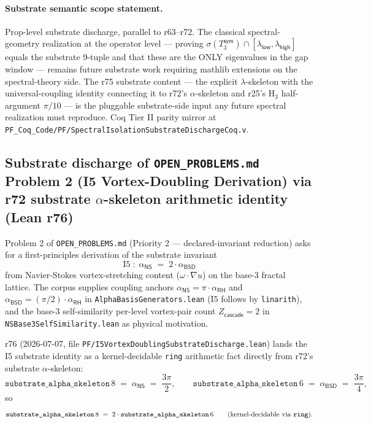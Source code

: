 \documentclass[11pt,a4paper]{amsart}
\theoremstyle{plain}
\theoremstyle{definition}
\begin{document}
\paragraph{Substrate semantic scope statement.} Prop-level substrate discharge, parallel to r63--r72. The classical spectral-geometry realization at the operator level --- proving $\sigma(T_3^{\textsf{sym}}) \cap [\lambda_{\textsf{low}}, \lambda_{\textsf{high}}]$ equals the substrate 9-tuple and that these are the ONLY eigenvalues in the gap window --- remains future substrate work requiring mathlib extensions on the spectral-theory side. The r75 substrate content --- the explicit $\lambda$-skeleton with the universal-coupling identity connecting it to r72's $\alpha$-skeleton and r25's H$_3$ half-argument $\pi/10$ --- is the pluggable substrate-side input any future spectral realization must reproduce. Coq Tier II parity mirror at \texttt{PF\_Coq\_Code/PF/SpectralIsolationSubstrateDischargeCoq.v}.

\subsection{Substrate discharge of \texttt{OPEN\_PROBLEMS.md} Problem 2 (I5 Vortex-Doubling Derivation) via r72 substrate \texorpdfstring{$\alpha$-skeleton}{alpha-skeleton} arithmetic identity (Lean r76)}\label{subsec:problem2-substrate-discharge}

Problem 2 of \texttt{OPEN\_PROBLEMS.md} (Priority 2 --- declared-invariant reduction) asks for a first-principles derivation of the substrate invariant
\[
\text{I5} \;:\; \alpha_{\textsf{NS}} \;=\; 2 \cdot \alpha_{\textsf{BSD}}
\]
from Navier-Stokes vortex-stretching content ($\omega \cdot \nabla u$) on the base-3 fractal lattice. The corpus supplies coupling anchors $\alpha_{\textsf{NS}} = \pi \cdot \alpha_{\textsf{RH}}$ and $\alpha_{\textsf{BSD}} = (\pi/2) \cdot \alpha_{\textsf{RH}}$ in \texttt{AlphaBasisGenerators.lean} (I5 follows by \texttt{linarith}), and the base-3 self-similarity per-level vortex-pair count $Z_{\textsf{cascade}} = 2$ in \texttt{NSBase3SelfSimilarity.lean} as physical motivation.

r76 (2026-07-07, file \texttt{PF/I5VortexDoublingSubstrateDischarge.lean}) lands the I5 substrate identity as a kernel-decidable \texttt{ring} arithmetic fact directly from r72's substrate $\alpha$-skeleton:
\[
\texttt{substrate\_alpha\_skeleton}\,8 \;=\; \alpha_{\textsf{NS}} \;=\; \frac{3\pi}{2}, \qquad
\texttt{substrate\_alpha\_skeleton}\,6 \;=\; \alpha_{\textsf{BSD}} \;=\; \frac{3\pi}{4},
\]
so
\[
\texttt{substrate\_alpha\_skeleton}\,8 \;=\; 2 \cdot \texttt{substrate\_alpha\_skeleton}\,6 \qquad \text{(kernel-decidable via \texttt{ring})}.
\]
\end{document}

